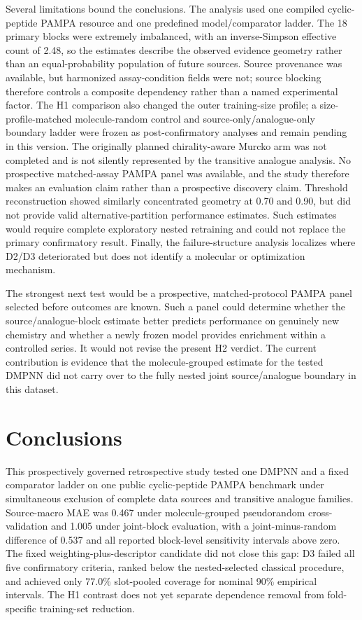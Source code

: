 \documentclass[referee,lineno,pdflatex,Numbered,sn-basic]{sn-jnl}
\begin{document}
Several limitations bound the conclusions. The analysis used one compiled cyclic-peptide PAMPA resource and one predefined model/comparator ladder. The 18 primary blocks were extremely imbalanced, with an inverse-Simpson effective count of 2.48, so the estimates describe the observed evidence geometry rather than an equal-probability population of future sources. Source provenance was available, but harmonized assay-condition fields were not; source blocking therefore controls a composite dependency rather than a named experimental factor. The H1 comparison also changed the outer training-size profile; a size-profile-matched molecule-random control and source-only/analogue-only boundary ladder were frozen as post-confirmatory analyses and remain pending in this version. The originally planned chirality-aware Murcko arm was not completed and is not silently represented by the transitive analogue analysis. No prospective matched-assay PAMPA panel was available, and the study therefore makes an evaluation claim rather than a prospective discovery claim. Threshold reconstruction showed similarly concentrated geometry at 0.70 and 0.90, but did not provide valid alternative-partition performance estimates. Such estimates would require complete exploratory nested retraining and could not replace the primary confirmatory result. Finally, the failure-structure analysis localizes where D2/D3 deteriorated but does not identify a molecular or optimization mechanism.

The strongest next test would be a prospective, matched-protocol PAMPA panel selected before outcomes are known. Such a panel could determine whether the source/analogue-block estimate better predicts performance on genuinely new chemistry and whether a newly frozen model provides enrichment within a controlled series. It would not revise the present H2 verdict. The current contribution is evidence that the molecule-grouped estimate for the tested DMPNN did not carry over to the fully nested joint source/analogue boundary in this dataset.

\section{Conclusions}

This prospectively governed retrospective study tested one DMPNN and a fixed comparator ladder on one public cyclic-peptide PAMPA benchmark under simultaneous exclusion of complete data sources and transitive analogue families. Source-macro MAE was 0.467 under molecule-grouped pseudorandom cross-validation and 1.005 under joint-block evaluation, with a joint-minus-random difference of 0.537 and all reported block-level sensitivity intervals above zero. The fixed weighting-plus-descriptor candidate did not close this gap: D3 failed all five confirmatory criteria, ranked below the nested-selected classical procedure, and achieved only 77.0\% slot-pooled coverage for nominal 90\% empirical intervals. The H1 contrast does not yet separate dependence removal from fold-specific training-set reduction.
\end{document}
